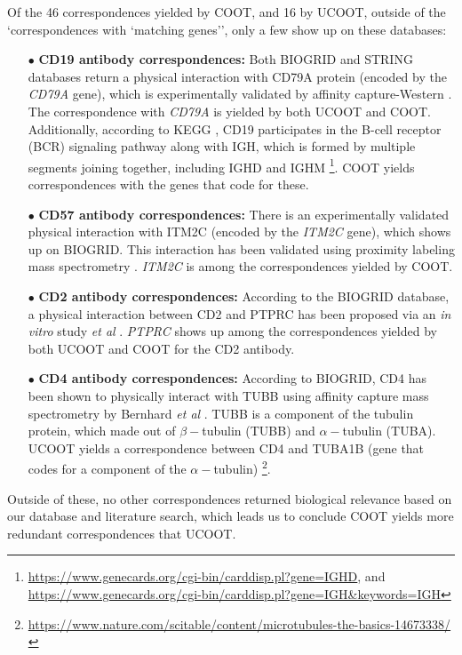 Of the 46 correspondences yielded by COOT, and 16 by UCOOT, outside of the
`correspondences with `matching genes'', only a few show up on these databases:
\begin{itemize}
    \item[$\bullet$] \textbf{CD19 antibody correspondences:} Both BIOGRID \citep{BIOGRID} and
    STRING \citep{STRING} databases return a physical interaction with CD79A protein
    (encoded by the \textit{CD79A} gene), which is experimentally validated by
    affinity capture-Western \citep{Carter97}. The correspondence with \textit{CD79A} is yielded
    by both UCOOT and COOT. Additionally, according to KEGG \citep{KEGG},
    CD19 participates in the B-cell receptor (BCR) signaling pathway along with IGH,
    which is formed by multiple segments joining together, including IGHD and
    IGHM \footnote{\url{https://www.genecards.org/cgi-bin/carddisp.pl?gene=IGHD},
    and \url{https://www.genecards.org/cgi-bin/carddisp.pl?gene=IGH&keywords=IGH}}.
    COOT yields correspondences with the genes that code for these.

    \item[$\bullet$] \textbf{CD57 antibody correspondences:} There is an experimentally validated
    physical interaction with ITM2C (encoded by the \textit{ITM2C} gene), which shows up on BIOGRID.
    This interaction has been validated using proximity labeling mass spectrometry \citep{Go2021}.
    \textit{ITM2C} is among the correspondences yielded by COOT.

    \item[$\bullet$] \textbf{CD2 antibody correspondences:} According to the BIOGRID database,
    a physical interaction between CD2 and PTPRC has been proposed via an \textit{in vitro}
    study \textit{et al} \citep{Schraven90}. \textit{PTPRC} shows up among the correspondences
    yielded by both UCOOT and COOT for the CD2 antibody.

    \item[$\bullet$] \textbf{CD4 antibody correspondences:} According to BIOGRID, CD4 has been shown
    to physically interact with TUBB using affinity capture mass spectrometry by
    Bernhard \textit{et al} \citep{Bernhard2004}. TUBB is a component of the tubulin protein,
    which made out of $\beta-$tubulin (TUBB) and $\alpha-$tubulin (TUBA).
    UCOOT yields a correspondence between CD4 and TUBA1B (gene that codes for a component
    of the $\alpha-$tubulin)
    \footnote{\url{https://www.nature.com/scitable/content/microtubules-the-basics-14673338/}}.
\end{itemize}
Outside of these, no other correspondences returned biological relevance based on our database and
literature search, which leads us to conclude COOT yields more redundant correspondences that UCOOT.

